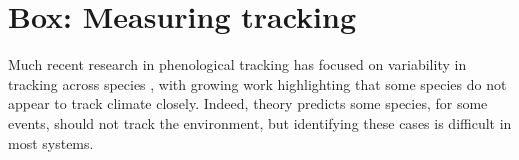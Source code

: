 \documentclass[11pt,letterpaper]{article}
\begin{document}


\section{Box: Measuring tracking}
Much recent research in phenological tracking has focused on variability in tracking across species \citep[e.g.,][]{Willis:2008bf,Cook:2012pnas,bolmgren2013,CaraDonna2014,Zettlemoyer2019}, with growing work highlighting that some species do not appear to track climate closely. Indeed, theory predicts some species, for some events, should not track the environment, but identifying these cases is difficult in most systems. %
\end{document}
